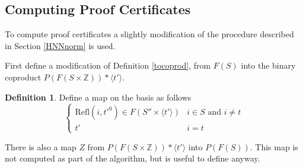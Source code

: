 \documentclass[11pt]{article} %
\theoremstyle{definition}
\theoremstyle{definition}
\theoremstyle{definition}
\theoremstyle{definition}
\theoremstyle{definition}
\newtheorem{defn}[theorem]{Definition}
\theoremstyle{definition}
\begin{document}


\subsection{Computing Proof Certificates}\label{HNNPC}

To compute proof certificates a slightly modification of the procedure described in Section
\ref{HNNnorm} is used.

First define a modification of Definition \ref{tocoprod}, from $F(S)$ into the binary
coproduct $P(F(S \times \mathbb{Z})) \ast \langle t' \rangle$.

\begin{defn}\label{tocoprodP}
  Define a map on the basis as follows
  \begin{equation}
    \begin{cases}
      \text{Refl}(i, t'^0) \in F(S'' \times \langle t' \rangle) & i \in S \text{ and } i \ne t \\
      t' & i = t
    \end{cases}
  \end{equation}
\end{defn}

There is also a map $Z$ from $P(F(S \times \mathbb{Z})) \ast \langle t' \rangle$ into
$P(F(S))$. This map is not computed as part of the algorithm, but is useful to define anyway.
\end{document}
